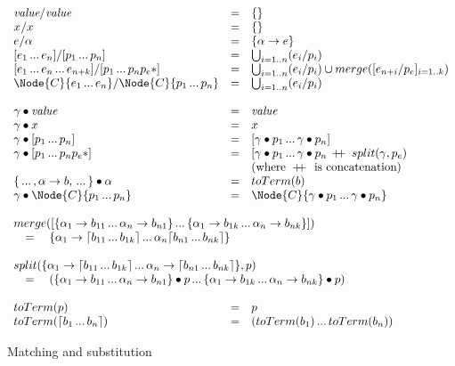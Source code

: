 \begin{figure}[t]
\[\begin{array}{lclll}
\Match{\Value}{\Value} &=& \{\} \\
\Match{\VarX}{\VarX} &=& \{\} \\
\Match{e}{\PVarA} &=& \{\PVarA \to e\} \\
\Match{[e_1 \dd e_n]}{[p_1 \dd p_n]} &=&
  \bigcup_{i=1..n} (\Match{e_i}{p_i}) \\
\Match{[e_1 \dd e_n \dd e_{n+k}]}{[p_1 \dd p_n \Ell{p_e}]} &=&
  \bigcup_{i=1..n} (\Match{e_i}{p_i}) \cup
  merge([\Match{e_{n+i}}{p_e}]_{i=1..k}) \\
\Match{\Node{C}{e_1 \dd e_n}}{\Node{C}{p_1 \dd p_n}} &=&
  \bigcup_{i=1..n} (\Match{e_i}{p_i}) \\ \\

\Subs{\gamma}{\Value}        &=& \Value \\
\Subs{\gamma}{\VarX}        &=& \VarX \\
\Subs{\gamma}{[p_1 \dd p_n]}    &=& [\Subs{\gamma}{p_1} \dd \Subs{\gamma}{p_n}] \\
\Subs{\gamma}{[p_1 \dd p_n \Ell{p_e}]} &=&
  [\Subs{\gamma}{p_1} \dd \Subs{\gamma}{p_n\,\DoublePlus\,split(\gamma, p_e)} \\
    &&\text{(where } \DoublePlus \text{ is concatenation)} \\
\Subs{\{\dd,\PVarA \to b,\dd\}}{\PVarA} &=& toTerm(b) \\
\Subs{\gamma}{\Node{C}{p_1 \dd p_n}} &=&
  \Node{C}{\Subs{\gamma}{p_1} \dd \Subs{\gamma}{p_n}} \\ \\

\multicolumn{3}{l}{merge([\{\PVarA_1 \to b_{11} \dd \PVarA_n \to b_{n1}\}
    \dd \{\PVarA_1 \to b_{1k} \dd \PVarA_n \to b_{nk}\}])} \\
\multicolumn{3}{l}{\quad=\quad \{\PVarA_1 \to \BList{b_{11} \dd b_{1k}} \dd
  \PVarA_n \BList{b_{n1} \dd b_{nk}}\}} \\ \\

\multicolumn{3}{l}{split(\{\PVarA_1 \to \BList{b_{11} \dd b_{1k}} \dd 
  \PVarA_n \to \BList{b_{n1} \dd b_{nk}}\}, p)} \\
\multicolumn{3}{l}{\quad=\quad
  (\Subs{\{\PVarA_1 \to b_{11} \dd  \PVarA_n \to b_{n1}\}}{p} \dd 
   \Subs{\{\PVarA_1 \to b_{1k} \dd  \PVarA_n \to b_{nk}\}}{p})} \\ \\

toTerm(p) &=& p \\
toTerm(\BList{b_1 \dd b_n}) &=&
  (toTerm(b_1) \dd toTerm(b_n))

\end{array}\]
\caption{Matching and substitution}
\label{fig:reval-formal-subs}
\end{figure}


